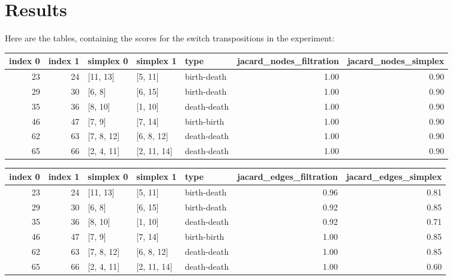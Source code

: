 \documentclass{article}
\begin{document}
\section{Results}

\par Here are the tables, containing the scores for the switch transpositions in the experiment:

\begin{center}
\begin{tabular}{rrlllrr}
\toprule
index 0 & index 1 & simplex 0 & simplex 1 & type & jacard\_nodes\_filtration & jacard\_nodes\_simplex \\
\midrule
23 & 24 & [11, 13] & [5, 11] & birth-death & 1.00 & 0.90 \\
29 & 30 & [6, 8] & [6, 15] & birth-death & 1.00 & 0.90 \\
35 & 36 & [8, 10] & [1, 10] & death-death & 1.00 & 0.90 \\
46 & 47 & [7, 9] & [7, 14] & birth-birth & 1.00 & 0.90 \\
62 & 63 & [7, 8, 12] & [6, 8, 12] & death-death & 1.00 & 0.90 \\
65 & 66 & [2, 4, 11] & [2, 11, 14] & death-death & 1.00 & 0.90 \\
\bottomrule
\end{tabular}
\end{center}

\begin{center}
\begin{tabular}{rrlllrr}
\toprule
index 0 & index 1 & simplex 0 & simplex 1 & type & jacard\_edges\_filtration & jacard\_edges\_simplex \\
\midrule
23 & 24 & [11, 13] & [5, 11] & birth-death & 0.96 & 0.81 \\
29 & 30 & [6, 8] & [6, 15] & birth-death & 0.92 & 0.85 \\
35 & 36 & [8, 10] & [1, 10] & death-death & 0.92 & 0.71 \\
46 & 47 & [7, 9] & [7, 14] & birth-birth & 1.00 & 0.85 \\
62 & 63 & [7, 8, 12] & [6, 8, 12] & death-death & 1.00 & 0.85 \\
65 & 66 & [2, 4, 11] & [2, 11, 14] & death-death & 1.00 & 0.60 \\
\bottomrule
\end{tabular}
\end{center}
\end{document}

